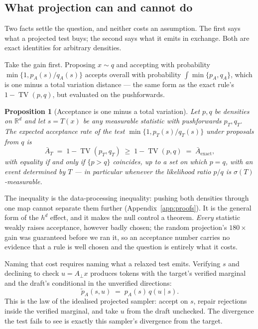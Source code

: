 \documentclass[10pt]{article}
\newtheorem{proposition}{Proposition}
\DeclareMathOperator{\TV}{TV}
\newcommand{\R}{\mathbb{R}}
\newcommand{\dd}{d}
\begin{document}
\subsection{What projection can and cannot do}

Two facts settle the question, and neither costs an assumption. The first says what a projected test
buys; the second says what it emits in exchange. Both are exact identities for arbitrary densities.

Take the gain first. Proposing $x \sim q$ and accepting with probability $\min\{1, p_A(s)/q_A(s)\}$
accepts overall with probability $\int \min\{p_A, q_A\}$, which is one minus a total variation
distance --- the same form as the exact rule's $1 - \TV(p,q)$, but evaluated on the pushforwards.

\begin{proposition}[Acceptance is one minus a total variation]
\label{prop:tv}
Let $p, q$ be densities on $\R^\dd$ and let $s = T(x)$ be any measurable statistic with pushforwards
$p_T, q_T$. The expected acceptance rate of the test $\min\{1, p_T(s)/q_T(s)\}$ under proposals from
$q$ is
\begin{equation}
\bar{A}_T \;=\; 1 - \TV(p_T, q_T) \;\ge\; 1 - \TV(p, q) \;=\; \bar{A}_{\mathrm{exact}},
\label{eq:tv}
\end{equation}
with equality if and only if $\{p > q\}$ coincides, up to a set on which $p = q$, with an event
determined by $T$ --- in particular whenever the likelihood ratio $p/q$ is $\sigma(T)$-measurable.
\end{proposition}

The inequality is the data-processing inequality: pushing both densities through one map cannot
separate them further (Appendix~\ref{app:proofs}). It is the general form of the $h^\dd$ effect, and
it makes the null control a theorem. \emph{Every} statistic weakly raises acceptance, however badly
chosen; the random projection's $180\times$ gain was guaranteed before we ran it, so an acceptance
number carries no evidence that a rule is well chosen and the question is entirely what it costs.

Naming that cost requires naming what a relaxed test emits. Verifying $s$ and declining to check
$u = A_\perp x$ produces tokens with the target's verified marginal and the draft's conditional in
the unverified directions:
\begin{equation}
\tilde{p}_A(s, u) \;=\; p_A(s)\, q(u \mid s).
\label{eq:emitter}
\end{equation}
This is the law of the idealised projected sampler: accept on $s$, repair rejections inside the
verified marginal, and take $u$ from the draft unchecked. The divergence the test fails to see is
exactly this sampler's divergence from the target.
\end{document}
